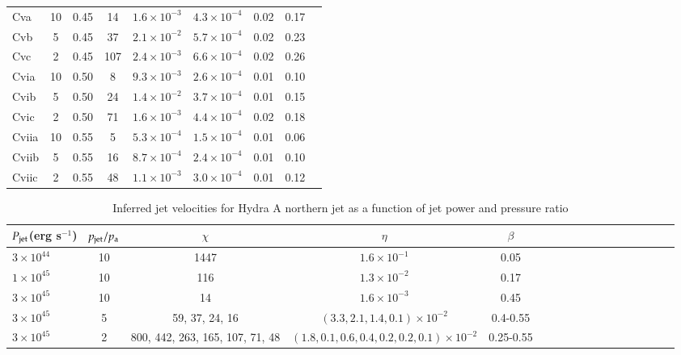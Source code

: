 \begin{table}
\begin{tabular}{l * {8}{c}}
	Cva 	& 10 & 0.45 &  14 & $1.6\times10^{-3}$	& $4.3\times10^{-4}$	 		&	0.02   	&	0.17   \\

    Cvb    &5 & 0.45 & 37 & $2.1\times10^{-2}$   	& $5.7\times10^{-4}$	 		&	0.02  	&	 0.23 \\
    Cvc   &2 & 0.45 & 107 & $2.4\times10^{-3}$  	& $6.6\times10^{-4}$	 		&	0.02  	& 0.26	 \\

	Cvia & 10 & 0.50 & 8 &  $9.3\times10^{-3}$ 	& $2.6\times10^{-4}$	 		&	0.01	 	& 0.10	 \\

  Cvib    &5 & 0.50 & 24 & $1.4\times10^{-2}$   	&  $3.7\times10^{-4}$	 		&	0.01 		&	0.15	 \\
   Cvic    &2 & 0.50 & 71 & $1.6\times10^{-3}$   	& $4.4\times10^{-4}$	  		&	0.02	 	& 0.18	 \\

	Cviia	& 10 & 0.55 & 5 & $5.3\times10^{-4}$ 	& $1.5\times10^{-4}$	 		&	0.01  	& 0.06	 \\

   Cviib   &5 & 0.55 & 16 & $8.7\times10^{-4}$  	& $2.4\times10^{-4}$	   		&	0.01  	&	 0.10 \\
   Cviic   &2 & 0.55 & 48 & $1.1\times10^{-3}$  	& $3.0\times10^{-4}$	 		&	0.01  	& 0.12 		\\
\hline
	
\end{tabular}
\label{simulation_parameters}
\end{table}




\begin{table}
\caption{Inferred jet velocities for Hydra A northern jet as a function of jet power and pressure ratio}
\begin{tabular}{l * {16}{c}}
\hline \hline
$P_{\rm{jet}}$(erg s$^{-1}$) & $p_{\rm{jet}}/p_{\rm{a}}$  & $\chi$ & $\eta$ & $\beta$ \\
\hline
 $3\times10^{44}$ & 10 & 1447 & $1.6\times10^{-1}$ & 0.05 \\ 
 $1\times10^{45}$ & 10 &  116 & $1.3\times10^{-2}$   & 0.17 \\ 
 $3\times10^{45}$ & 10 &   14 & $1.6\times10^{-3}$ & 0.45 \\ 
 $3\times10^{45}$ &  5 &   59, 37, 24, 16 & $(3.3, 2.1, 1.4, 0.1)\times10^{-2}$ & 0.4-0.55 \\ 
  $3\times10^{45}$ &  2 &   800, 442, 263, 165, 107, 71, 48  & $(1.8, 0.1, 0.6, 0.4, 0.2, 0.2, 0.1)\times10^{-2}$ & 0.25-0.55 \\ 
\end{tabular}
\label{inferred_jet_velocities}
\end{table}


